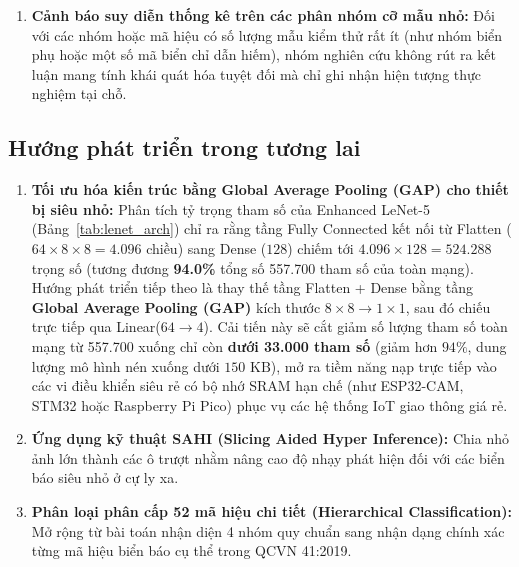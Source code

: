 \begin{enumerate}
    \item \textbf{Cảnh báo suy diễn thống kê trên các phân nhóm cỡ mẫu nhỏ:} Đối với các nhóm hoặc mã hiệu có số lượng mẫu kiểm thử rất ít (như nhóm biển phụ hoặc một số mã biển chỉ dẫn hiếm), nhóm nghiên cứu không rút ra kết luận mang tính khái quát hóa tuyệt đối mà chỉ ghi nhận hiện tượng thực nghiệm tại chỗ.
\end{enumerate}

\subsection{Hướng phát triển trong tương lai}
\label{subsec:huong_phat_trien}

\begin{enumerate}
    \item \textbf{Tối ưu hóa kiến trúc bằng Global Average Pooling (GAP) cho thiết bị siêu nhỏ:}
    Phân tích tỷ trọng tham số của Enhanced LeNet-5 (Bảng~\ref{tab:lenet_arch}) chỉ ra rằng tầng Fully Connected kết nối từ Flatten ($64 \times 8 \times 8 = 4.096$ chiều) sang Dense ($128$) chiếm tới $4.096 \times 128 = 524.288$ trọng số (tương đương \textbf{94.0\%} tổng số 557.700 tham số của toàn mạng). Hướng phát triển tiếp theo là thay thế tầng Flatten + Dense bằng tầng \textbf{Global Average Pooling (GAP)} kích thước $8 \times 8 \rightarrow 1 \times 1$, sau đó chiếu trực tiếp qua Linear($64 \rightarrow 4$). Cải tiến này sẽ cắt giảm số lượng tham số toàn mạng từ 557.700 xuống chỉ còn \textbf{dưới 33.000 tham số} (giảm hơn $94\%$, dung lượng mô hình nén xuống dưới $150\text{ KB}$), mở ra tiềm năng nạp trực tiếp vào các vi điều khiển siêu rẻ có bộ nhớ SRAM hạn chế (như ESP32-CAM, STM32 hoặc Raspberry Pi Pico) phục vụ các hệ thống IoT giao thông giá rẻ.
    \item \textbf{Ứng dụng kỹ thuật SAHI (Slicing Aided Hyper Inference):} Chia nhỏ ảnh lớn thành các ô trượt nhằm nâng cao độ nhạy phát hiện đối với các biển báo siêu nhỏ ở cự ly xa.
    \item \textbf{Phân loại phân cấp 52 mã hiệu chi tiết (Hierarchical Classification):} Mở rộng từ bài toán nhận diện 4 nhóm quy chuẩn sang nhận dạng chính xác từng mã hiệu biển báo cụ thể trong QCVN 41:2019.
\end{enumerate}
